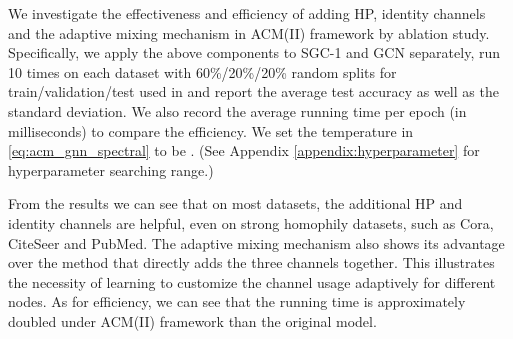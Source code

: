 \documentclass{article}
\newcommand{\0}{{\boldsymbol{0}}}
\newcommand{\6}{{\partial}}
\newcommand{\8}{{\infty}}
\newcommand{\4}{{\nabla}}
\begin{document}
%
 We investigate the effectiveness and efficiency of adding HP, identity channels and the adaptive mixing mechanism in ACM(II) framework by ablation study. Specifically, we apply the above components to SGC-1 and GCN separately, run 10 times on each dataset with 60\%/20\%/20\% random splits for train/validation/test used in \cite{chien2021adaptive} and report the average test accuracy as well as the standard deviation. We also record the average running time per epoch (in milliseconds) to compare the efficiency. We set the temperature  in \eqref{eq:acm_gnn_spectral} to be . (See Appendix \ref{appendix:hyperparameter} for hyperparameter searching range.)

From the results we can see that on most datasets, the additional HP and identity channels are helpful, even on strong homophily datasets, such as Cora, CiteSeer and PubMed. The adaptive mixing mechanism also shows its advantage over the method that directly adds the three channels together. This illustrates the necessity of learning to customize the channel usage adaptively for different nodes. As for efficiency, we can see that the running time is approximately doubled under ACM(II) framework than the original model.
\end{document}
